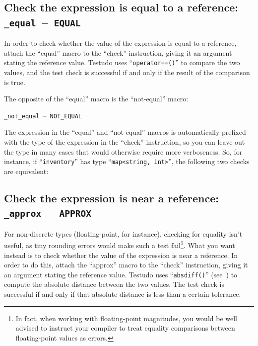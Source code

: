 \documentclass[twoside, a4paper, article]{memoir}
\newcommand*\testudocolor{\color{red!80!blue}}
\newcommand*\testudo[1]{\texttt{\testudocolor{}#1}}
\newcommand*\testudopair[2]{\testudo{#1}~--~\testudo{#2}}
\newcommand\subsectiontestudopair[3]{%
  \subsection[#1]{#1: \testudopair{#2}{#3}}}
\newcommand\typesetexample[1]{%
  \typesetexamplesource{#1}
}
\newcommand\typesetexampleandreport[1]{%
  \typesetexamplesource{#1}
  \typesetexamplereport{#1}
}
\providecommand\typesetexamplereport[1]{%
}
\providecommand\typesetexamplesource[1]{%
}
\begin{document}
\typesetexampleandreport{check-false}

\subsectiontestudopair{Check the expression is equal to a reference}%
  {\_equal}{EQUAL}
\label{sec:check-expression-equal-reference}

In order to check whether the value of the expression is equal to a reference,
attach the ``equal'' macro to the ``check'' instruction, giving it an argument
stating the reference value.  Testudo uses ``\texttt{operator==()}'' to
compare the two values, and the test check is successful if and only if the
result of the comparison is true.

\typesetexampleandreport{check-equal}

The opposite of the ``equal'' macro is the ``not-equal'' macro:
\begin{center}
  \testudopair{\_not\_equal}{NOT\_EQUAL}
\end{center}

\typesetexampleandreport{check-not-equal}

The expression in the ``equal'' and ``not-equal'' macros is automatically
prefixed with the type of the expression in the ``check'' instruction, so you
can leave out the type in many cases that would otherwise require more
verboseness.  So, for instance, if ``\texttt{inventory}'' has type
``\texttt{map<string, int>}'', the following two checks are equivalent:

\typesetexampleandreport{check-equal-automatic-type}




\subsectiontestudopair{Check the expression is near a reference}%
  {\_approx}{APPROX}
\label{sec:check-expression-near-reference}

For non-discrete types (floating-point, for instance), checking for equality
isn't useful, as tiny rounding errors would make such a test fail\footnote{In
  fact, when working with floating-point magnitudes, you would be well advised
  to instruct your compiler to treat equality comparisons between
  floating-point values as errors.}.  What you want instead is to check whether
the value of the expression is near a reference.  In order to do this, attach
the ``approx'' macro to the ``check'' instruction, giving it an argument
stating the reference value.  Testudo uses ``\texttt{absdiff()}''
(see~) to compute the absolute distance
between the two values.  The test check is successful if and only if that
absolute distance is less than a certain tolerance.
\end{document}
